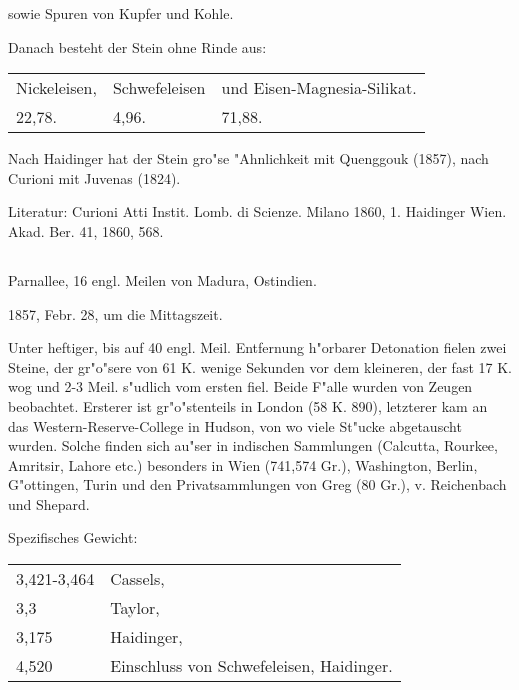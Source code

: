 \documentclass[a4paper, 11pt, oneside]{article}
\begin{document}
sowie Spuren von Kupfer und Kohle.

Danach besteht der Stein ohne Rinde aus:
\begin{table}[H]
    \centering\swabfamily\Large
    \begin{tabular}{l l l}
        Nickeleisen, & Schwefeleisen & und Eisen-Magnesia-Silikat. \\
        22,78. & 4,96. & 71,88.\\
    \end{tabular}
\end{table}

Nach Haidinger hat der Stein gro"se "Ahnlichkeit mit Quenggouk (1857), nach Curioni mit Juvenas (1824).

\normalsize
Literatur: Curioni Atti Instit. Lomb. di Scienze. Milano 1860, 1. Haidinger Wien. Akad. Ber. 41, 1860, 568.

\subsection{}
\LARGE
\paragraph{}
Parnallee, 16 engl. Meilen von Madura, Ostindien.

1857, Febr. 28, um die Mittagszeit.

Unter heftiger, bis auf 40 engl. Meil. Entfernung h"orbarer Detonation fielen zwei Steine, der gr"o"sere von 61 K. wenige Sekunden vor dem kleineren, der fast 17 K. wog und 2-3 Meil. s"udlich vom ersten fiel. Beide F"alle wurden von Zeugen beobachtet. Ersterer ist gr"o"stenteils in London (58 K. 890), letzterer kam an das Western-Reserve-College in Hudson, von wo viele St"ucke abgetauscht wurden. Solche finden sich au"ser in indischen Sammlungen (Calcutta, Rourkee, Amritsir, Lahore etc.) besonders in Wien (741,574 Gr.), Washington, Berlin, G"ottingen, Turin und den Privatsammlungen von Greg (80 Gr.), v. Reichenbach und Shepard.

Spezifisches Gewicht:  
\begin{table}[!ht]
    \centering\swabfamily\Large
    \begin{tabular}{l l}
        3,421-3,464 & Cassels,\\
        3,3 & Taylor,\\
        3,175 & Haidinger,\\
        4,520 & Einschluss von Schwefeleisen, Haidinger.
    \end{tabular}
\end{table}
\end{document}
